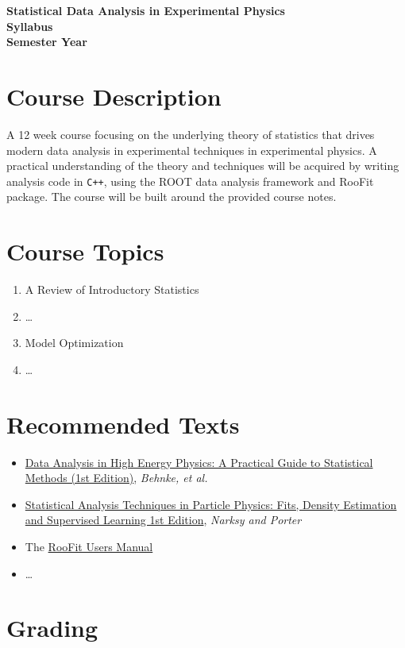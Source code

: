 \documentclass[aps,letterpaper,12pt]{article}
\begin{document}
\begin{centering}
\textbf{Statistical Data Analysis in Experimental Physics}\\
\textbf{Syllabus}\\
\textbf{Semester Year}\\
\end{centering}\vspace{30pt}

\section*{Course Description}
A 12 week course focusing on the underlying theory of statistics that drives modern data analysis in experimental techniques in experimental physics. A practical understanding of the theory and techniques will be acquired by writing analysis code in \texttt{C++}, using the ROOT data analysis framework and RooFit package. The course will be built around the provided course notes.

\section*{Course Topics}

\begin{enumerate}
	\item A Review of Introductory Statistics
	\item \ldots
	\item Model Optimization
	\item \ldots
\end{enumerate}

\section*{Recommended Texts}

\begin{itemize}
	\item \href{http://smile.amazon.com/Data-Analysis-High-Energy-Physics/dp/3527410589/}{Data Analysis in High Energy Physics: A Practical Guide to Statistical Methods (1st Edition)}, \emph{Behnke, et al.}
	\item \href{http://smile.amazon.com/dp/3527410864/}{Statistical Analysis Techniques in Particle Physics: Fits, Density Estimation and Supervised Learning 1st Edition}, \emph{Narksy and Porter}
	\item The \href{https://root.cern.ch/root-user-guides-and-manuals}{RooFit Users Manual}
	\item \ldots
\end{itemize}

\section*{Grading}


\end{document}
